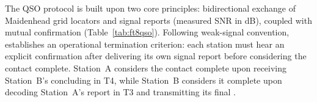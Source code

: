 The \LQ{} QSO protocol is built upon two core principles: bidirectional exchange of Maidenhead grid locators and signal reports (measured SNR in dB), coupled with mutual confirmation (Table~\ref{tab:ft8qso}). Following weak-signal convention, \LQ{} establishes an operational termination criterion: each station must hear an explicit confirmation after delivering its own signal report before considering the contact complete. Station~A considers the contact complete upon receiving Station~B's concluding  in T4, while Station~B considers it complete upon decoding Station~A's report in T3 and transmitting its final .

\begin{table}[htbp]
\centering
\caption{QSO sequence comparison between conventional protocols (FT8) and the  4-slot protocol.}
\label{tab:ft8qso}
\end{table}

